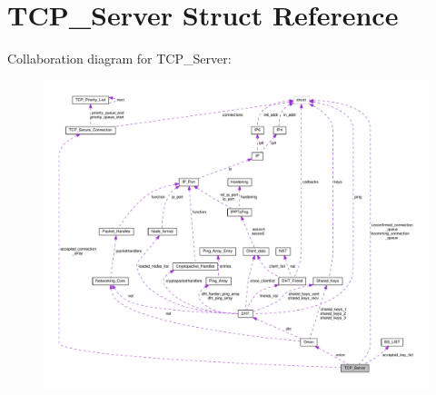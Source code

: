 \hypertarget{struct_t_c_p___server}{\section{T\+C\+P\+\_\+\+Server Struct Reference}
\label{struct_t_c_p___server}
}


Collaboration diagram for T\+C\+P\+\_\+\+Server\+:
\nopagebreak
\begin{figure}[H]
\begin{center}
\leavevmode
\includegraphics[width=350pt]{struct_t_c_p___server__coll__graph}
\end{center}
\end{figure}
